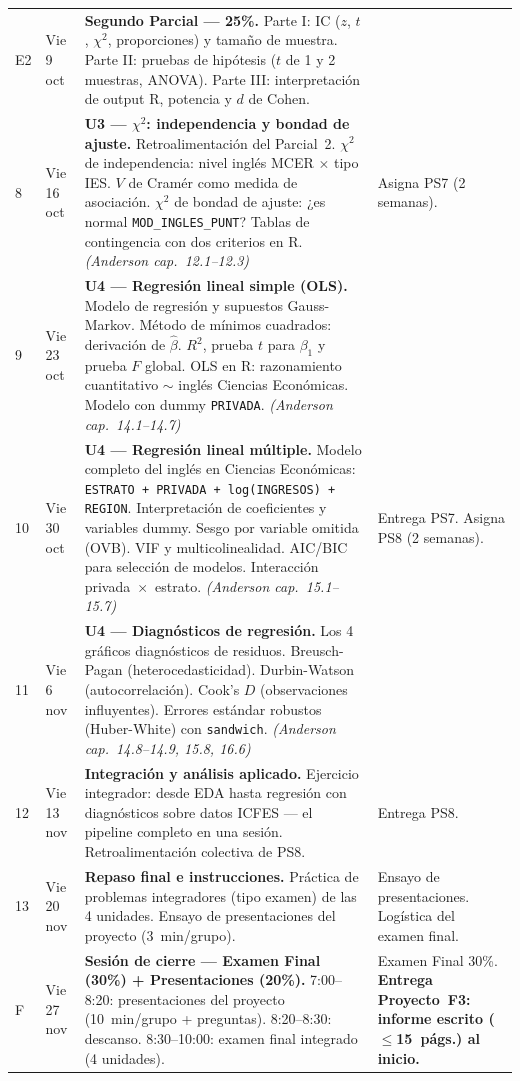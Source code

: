 \documentclass[11pt, a4paper]{article}
\begin{document}
{\begin{longtable}{C{0.7cm} L{2.1cm} L{6.4cm} L{5.2cm}}
%
E2 & Vie 9 oct &
  \textbf{Segundo Parcial --- 25\%.}
  Parte I: IC ($z$, $t$, $\chi^2$, proporciones) y tama\~no de muestra.
  Parte II: pruebas de hip\'otesis ($t$ de 1 y 2 muestras, ANOVA).
  Parte III: interpretaci\'on de output R, potencia y $d$ de Cohen. & \\[3pt]
%
%
8  & Vie 16 oct &
  \textbf{U3 --- $\chi^2$: independencia y bondad de ajuste.}
  Retroalimentaci\'on del Parcial~2.
  $\chi^2$ de independencia: nivel ingl\'es MCER $\times$ tipo IES.
  $V$ de Cram\'er como medida de asociaci\'on.
  $\chi^2$ de bondad de ajuste: ¿es normal \texttt{MOD\_INGLES\_PUNT}?
  Tablas de contingencia con dos criterios en R.
  \textit{(Anderson cap.\ 12.1--12.3)} &
  Asigna PS7 (2 semanas). \\[3pt]
%
9  & Vie 23 oct &
  \textbf{U4 --- Regresi\'on lineal simple (OLS).}
  Modelo de regresi\'on y supuestos Gauss-Markov.
  M\'etodo de m\'inimos cuadrados: derivaci\'on de $\hat{\beta}$.
  $R^2$, prueba $t$ para $\beta_1$ y prueba $F$ global.
  OLS en R: razonamiento cuantitativo $\sim$ ingl\'es Ciencias Econ\'omicas.
  Modelo con dummy \texttt{PRIVADA}.
  \textit{(Anderson cap.\ 14.1--14.7)} &  \\[3pt]
%
10 & Vie 30 oct &
  \textbf{U4 --- Regresi\'on lineal m\'ultiple.}
  Modelo completo del ingl\'es en Ciencias Econ\'omicas: \texttt{ESTRATO + PRIVADA + log(INGRESOS) + REGION}.
  Interpretaci\'on de coeficientes y variables dummy.
  Sesgo por variable omitida (OVB). VIF y multicolinealidad.
  AIC/BIC para selecci\'on de modelos.
  Interacci\'on privada~$\times$~estrato.
  \textit{(Anderson cap.\ 15.1--15.7)} &
  Entrega PS7. Asigna PS8 (2 semanas). \\[3pt]
%
11 & Vie 6 nov &
  \textbf{U4 --- Diagn\'osticos de regresi\'on.}
  Los 4 gr\'aficos diagn\'osticos de residuos.
  Breusch-Pagan (heterocedasticidad). Durbin-Watson (autocorrelaci\'on).
  Cook's $D$ (observaciones influyentes).
  Errores est\'andar robustos (Huber-White) con \texttt{sandwich}.
  \textit{(Anderson cap.\ 14.8--14.9, 15.8, 16.6)} &  \\[3pt]
%
12 & Vie 13 nov &
  \textbf{Integraci\'on y an\'alisis aplicado.}
  Ejercicio integrador: desde EDA hasta regresi\'on con diagn\'osticos
  sobre datos ICFES --- el pipeline completo en una sesi\'on.
  Retroalimentaci\'on colectiva de PS8. &
  Entrega PS8. \\[3pt]
%
13 & Vie 20 nov &
  \textbf{Repaso final e instrucciones.}
  Pr\'actica de problemas integradores (tipo examen) de las 4 unidades.
  Ensayo de presentaciones del proyecto (3~min/grupo). &
  Ensayo de presentaciones. Log\'istica del examen final. \\[3pt]
%
F  & Vie 27 nov &
  \textbf{Sesi\'on de cierre --- Examen Final (30\%) + Presentaciones (20\%).}
  7:00--8:20: presentaciones del proyecto (10~min/grupo + preguntas).
  8:20--8:30: descanso.
  8:30--10:00: examen final integrado (4 unidades). &
  Examen Final 30\%.
  \textbf{Entrega Proyecto~F3: informe escrito ($\leq$15~p\'ags.) al inicio.} \\
%
\end{longtable}
}
\end{document}
